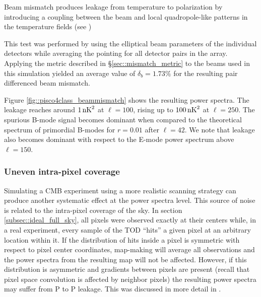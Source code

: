 \documentclass[a4paper,11pt]{article}
\begin{document}
Beam mismatch produces leakage from temperature to polarization by introducing a coupling between the beam and local quadropole-like patterns in the temperature fields (see \cite{2007MNRAS.376.1767O}) 

This test was performed by using the elliptical beam parameters of the individual detectors while averaging the pointing for all detector pairs in the array. Applying the metric described in \S\ref{sec::mismatch_metric} to the beams used in this simulation yielded an average value of  $\delta_b = 1.73\%$ for the resulting pair differenced beam mismatch. 

Figure \ref{fig::pisco4class_beammismatch} shows the resulting power spectra. The leakage reaches around $1\, \rm{nK}^2$ at $\ell=100$, rising up to $100 \, \rm{nK}^2$ at $\ell=250$. The spurious B-mode signal becomes dominant when compared to the theoretical spectrum of primordial B-modes for $r=0.01$ after $\ell=42$. We note that leakage also becomes dominant with respect to the E-mode power spectrum above $\ell=150$. 

\subsubsection{Uneven intra-pixel coverage}

Simulating a CMB experiment using a more realistic scanning strategy can produce another systematic effect at the power spectra level. This source of noise is related to the intra-pixel coverage of the sky. In section \ref{subsec::ideal_full_sky}, all pixels were observed exactly at their centers while, in a real experiment, every sample of the TOD ``hits'' a given pixel at an arbitrary location within it. If the distribution of hits inside a pixel is symmetric with respect to pixel center coordinates, map-making will average all observations and the power spectra from the resulting map will not be affected. However, if this distribution is asymmetric and gradients between pixels are present (recall that pixel space convolution is affected by neighbor pixels) the resulting power spectra may suffer from P to P leakage. This was discussed in more detail in \cite{2005poutanen}. 
\end{document}
